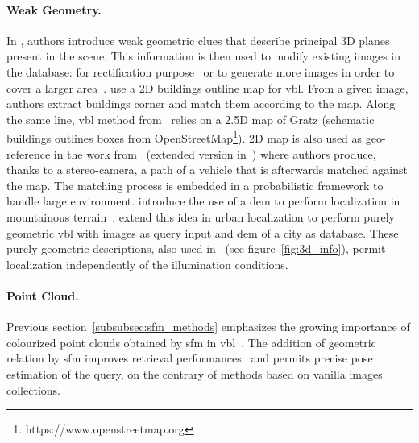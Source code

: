 		\paragraph{Weak Geometry.}
			\label{subsubsec:weak_geometry}			
			In \citep{Torii2015,Chen2011}, authors introduce weak geometric clues that describe principal 3D planes present in the scene. This information is then used to modify existing images in the database: for rectification purpose~\citep{Chen2011} or to generate more images in order to cover a larger area~\citep{Torii2015}. \citet{Cham2010} use a 2D buildings outline map for \ac{vbl}. From a given image, authors extract buildings corner and match them according to the map. Along the same line, \ac{vbl} method from~\citep{Arth2015} relies on a 2.5D map of Gratz (schematic buildings outlines boxes from OpenStreetMap\footnote{https://www.openstreetmap.org}). 2D map is also used as geo-reference in the work from~\citep{Brubaker2013} (extended version in~\citep{Brubaker2016}) where authors produce, thanks to a stereo-camera, a path of a vehicle that is afterwards matched against the map. The matching process is embedded in a probabilistic framework to handle large environment. \citet{Baatz2012} introduce the use of a \ac{dem} to perform localization in mountainous terrain~\citep{Ramalingam2010,Tzeng2013,Chen2015}. \citet{Bansal2014} extend this idea in urban localization to perform purely geometric \ac{vbl} with images as query input and \ac{dem} of a city as database. These purely geometric descriptions, also used in~\citep{Matei2013,Christie2016,Ramalingam2010,Ramalingam2011} (see figure~\ref{fig:3d_info}), permit localization independently of the illumination conditions.

		\paragraph{Point Cloud.}
        \label{subsubsec:3d_geometry}
			Previous section~\ref{subsubsec:sfm_methods} emphasizes the growing importance of colourized point clouds obtained by \ac{sfm} in \ac{vbl}~\citep{Irschara2009,Li2010,Sattler2011,Sattler2012,Sattler2015,Middelberg2014,Lynen2015,Lu2015,Svarm2014,Zeisl2015,Svarm2016,Sattler2016a,Feng2016a}. The addition of geometric relation by \ac{sfm} improves retrieval performances~\citep{Sattler2012a} and permits precise pose estimation of the query, on the contrary of methods based on vanilla images collections.
			
